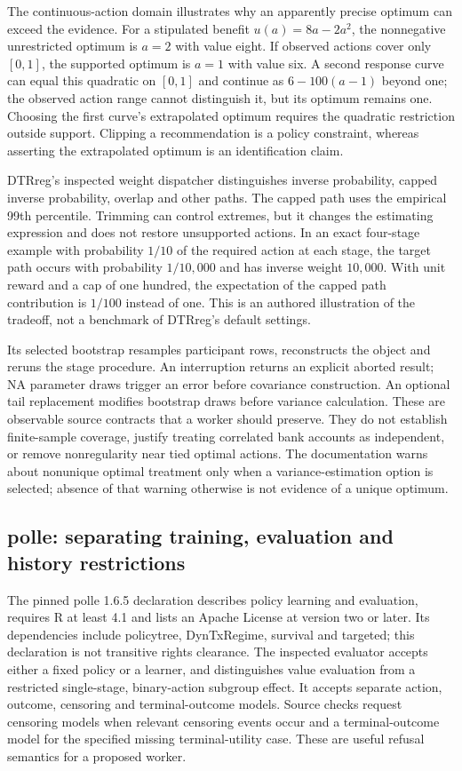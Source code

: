 The continuous-action domain illustrates why an apparently precise optimum can
exceed the evidence. For a stipulated benefit $u(a)=8a-2a^2$, the nonnegative
unrestricted optimum is $a=2$ with value eight. If observed actions cover only
$[0,1]$, the supported optimum is $a=1$ with value six. A second response curve
can equal this quadratic on $[0,1]$ and continue as $6-100(a-1)$ beyond one;
the observed action range cannot distinguish it, but its optimum remains one.
Choosing the first curve's extrapolated optimum requires the quadratic restriction
outside support. Clipping a recommendation is a policy constraint, whereas asserting
the extrapolated optimum is an identification claim.\citep{exec24_policiesr_reference}

DTRreg's inspected weight dispatcher distinguishes inverse probability, capped inverse
probability, overlap and other paths. The capped path uses the empirical 99th
percentile. Trimming can control extremes, but it changes the estimating expression
and does not restore unsupported actions. In an exact four-stage example with
probability $1/10$ of the required action at each stage, the target path occurs with
probability $1/10{,}000$ and has inverse weight $10{,}000$. With unit reward and a
cap of one hundred, the expectation of the capped path contribution is $1/100$
instead of one. This is an authored illustration of the tradeoff, not a benchmark
of DTRreg's default settings.\citep{exec24_policiesr_dtrreg,exec24_policiesr_reference}

Its selected bootstrap resamples participant rows, reconstructs the object and
reruns the stage procedure. An interruption returns an explicit aborted result;
NA parameter draws trigger an error before covariance construction. An optional
tail replacement modifies bootstrap draws before variance calculation. These
are observable source contracts that a worker should preserve. They do not
establish finite-sample coverage, justify treating correlated bank accounts as
independent, or remove nonregularity near tied optimal actions. The documentation
warns about nonunique optimal treatment only when a variance-estimation option is
selected; absence of that warning otherwise is not evidence of a unique optimum.
\citep{exec24_policiesr_dtrreg}

\subsection{polle: separating training, evaluation and history restrictions}
The pinned polle 1.6.5 declaration describes policy learning and evaluation, requires
R at least 4.1 and lists an Apache License at version two or later. Its dependencies
include policytree, DynTxRegime, survival and targeted; this declaration is not
transitive rights clearance. The inspected evaluator accepts either a fixed policy
or a learner, and distinguishes value evaluation from a restricted single-stage,
binary-action subgroup effect. It accepts separate action, outcome, censoring and
terminal-outcome models. Source checks request censoring models when relevant
censoring events occur and a terminal-outcome model for the specified missing
terminal-utility case. These are useful refusal semantics for a proposed worker.
\citep{exec24_policiesr_polle}

